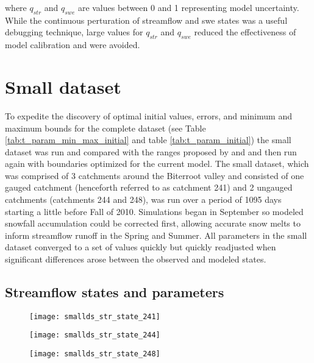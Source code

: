 where $q_{str}$ and $q_{swe}$ are values between 0 and 1 representing model uncertainty. While the continuous perturation of streamflow and swe states was a useful debugging technique, large values for $q_{str}$ and $q_{swe}$ reduced the effectiveness of model calibration and were avoided.

\section{Small dataset}

To expedite the discovery of optimal initial values, errors, and minimum and maximum bounds for the complete dataset (see Table \ref{tab:t_param_min_max_initial} and table  \ref{tab:t_param_initial}) the small dataset was run and compared with the ranges proposed by \cite{Seibert1997} and \cite{Wallner2013} and then run again with boundaries optimized for the current model.  The small dataset, which was comprised of 3 catchments around the Biterroot valley and consisted of one gauged catchment (henceforth referred to as catchment 241) and 2 ungauged catchments (catchments 244 and 248), was run over a period of 1095 days starting a little before Fall of 2010. Simulations began in September so modeled snowfall accumulation could be corrected first, allowing accurate snow melts to inform streamflow runoff in the Spring and Summer. All parameters in the small dataset converged to a set of values quickly but quickly readjusted when significant differences arose between the observed and modeled states.


\subsection{Streamflow states and parameters}

\begin{figure}
\centering
\begin{minipage}{.33\textwidth}
  \centering
  \texttt{[image: smallds\_str\_state\_241]}
  \label{fig:241st}
\end{minipage}%
\begin{minipage}{.33\textwidth}
  \centering
  \texttt{[image: smallds\_str\_state\_244]}
  \label{fig:244st}
\end{minipage}
\begin{minipage}{.33\textwidth}
  \centering
  \texttt{[image: smallds\_str\_state\_248]}
  \label{fig:248st}
\end{minipage}
\label{fig:str_state_small}
\end{figure}

